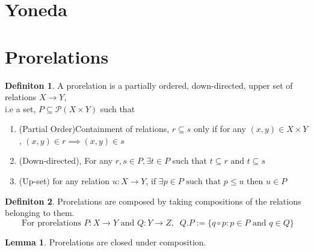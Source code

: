 \documentclass[18pt,a4paper]{article}
\theoremstyle{definition}
\newtheorem{definition}{Definiton}[section]
\newtheorem{lemma}{Lemma}[definition]
\begin{document}
\section{Yoneda}

\section{Prorelations}
\begin{definition}%
	A prorelation is a partially ordered, down-directed, upper set of relations $X \to Y$,\\
	i.e a set, $P \subseteq \mathcal{P}(X \times Y)$ such that
	\begin{enumerate}[label=(\roman*)]
		\item(Partial Order)Containment of relations, $r \subseteq s$
			only if for any $(x,y) \in X \times Y$,\: $(x,y) \in r \implies (x,y)\in s$
		\item (Down-directed), For any $r,s \in P, \exists t \in P $ such that
			$t\subseteq r \text{ and } t \subseteq s$
		\item (Up-set) for any relation $u:X\to Y$, if $\exists p \in P \text{ such that } p\leq u $
			then $u \in P$
	\end{enumerate}
\end{definition}
\begin{definition}%
	Prorelations are composed by taking compositions of the relations belonging to them.
	\[ \text{ For prorelations } P:X\to Y \text{ and } Q:Y\to Z,
	\; \; Q.P:=\{q \circ p : p \in P \text{ and } q \in Q  \} \]
\end{definition}
\begin{lemma}
	Prorelations are closed under composition.
\end{lemma}
\end{document}
